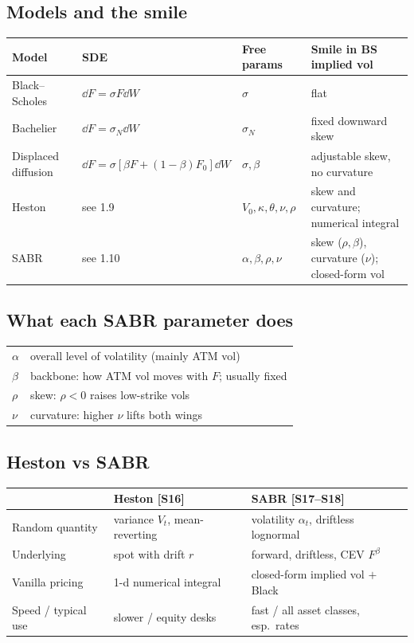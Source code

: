 \documentclass[10pt]{article}
\begin{document}
\subsection{Models and the smile}
{\small\begin{tabularx}{\linewidth}{@{}l X l X@{}}\toprule
Model & SDE & Free params & Smile in BS implied vol\\\midrule
Black--Scholes & $\dd F=\sigma F\dd W$ & $\sigma$ & flat\\
Bachelier & $\dd F=\sigma_N\dd W$ & $\sigma_N$ & fixed downward skew\\
Displaced diffusion & $\dd F=\sigma[\beta F+(1-\beta)F_0]\dd W$ & $\sigma,\beta$ & adjustable skew, no curvature\\
Heston & see 1.9 & $V_0,\kappa,\theta,\nu,\rho$ & skew and curvature; numerical integral\\
SABR & see 1.10 & $\alpha,\beta,\rho,\nu$ & skew ($\rho,\beta$), curvature ($\nu$); closed-form vol\\\bottomrule
\end{tabularx}}
\subsection{What each SABR parameter does \beyond}
{\small\begin{tabularx}{\linewidth}{@{}l X@{}}\toprule
$\alpha$ & overall level of volatility (mainly ATM vol)\\
$\beta$ & backbone: how ATM vol moves with $F$; usually fixed\\
$\rho$ & skew: $\rho<0$ raises low-strike vols\\
$\nu$ & curvature: higher $\nu$ lifts both wings\\\bottomrule
\end{tabularx}}
\subsection{Heston vs SABR}
{\small\begin{tabularx}{\linewidth}{@{}l X X@{}}\toprule
 & Heston [S16] & SABR [S17--S18]\\\midrule
Random quantity & variance $V_t$, mean-reverting & volatility $\alpha_t$, driftless lognormal\\
Underlying & spot with drift $r$ & forward, driftless, CEV $F^\beta$\\
Vanilla pricing & 1-d numerical integral & closed-form implied vol $+$ Black\\
Speed / typical use & slower / equity desks & fast / all asset classes, esp.\ rates\\\bottomrule
\end{tabularx}}
\end{document}

